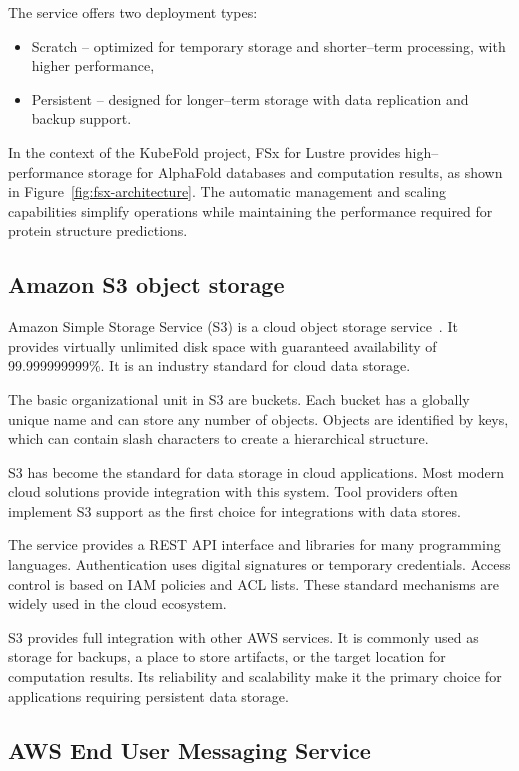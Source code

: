 The service offers two deployment types:
\begin{itemize}
    \item Scratch -- optimized for temporary storage and shorter--term processing, with higher performance,
    \item Persistent -- designed for longer--term storage with data replication and backup support.
\end{itemize}

In the context of the KubeFold project, FSx for Lustre provides high--performance storage for AlphaFold databases and computation results, as shown in Figure~\ref{fig:fsx-architecture}.
The automatic management and scaling capabilities simplify operations while maintaining the performance required for protein structure predictions.

\subsection{Amazon S3 object storage}\label{subsec:amazon-s3-object-storage}

Amazon Simple Storage Service (S3) is a cloud object storage service~\cite{aws_s3}.
It provides virtually unlimited disk space with guaranteed availability of 99.999999999\%.
It is an industry standard for cloud data storage.

The basic organizational unit in S3 are buckets.
Each bucket has a globally unique name and can store any number of objects.
Objects are identified by keys, which can contain slash characters to create a hierarchical structure.

S3 has become the standard for data storage in cloud applications.
Most modern cloud solutions provide integration with this system.
Tool providers often implement S3 support as the first choice for integrations with data stores.

The service provides a REST API interface and libraries for many programming languages.
Authentication uses digital signatures or temporary credentials.
Access control is based on IAM policies and ACL lists.
These standard mechanisms are widely used in the cloud ecosystem.

S3 provides full integration with other AWS services.
It is commonly used as storage for backups, a place to store artifacts, or the target location for computation results.
Its reliability and scalability make it the primary choice for applications requiring persistent data storage.

\subsection{AWS End User Messaging Service}\label{subsec:amazon-sns}

